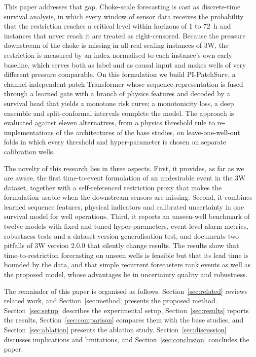 This paper addresses that gap. Choke-scale forecasting is cast as discrete-time survival analysis, in which
every window of sensor data receives the probability that the restriction reaches a critical level within
horizons of 1 to 72~h and instances that never reach it are treated as right-censored. Because the
pressure downstream of the choke is missing in all real scaling instances of 3W, the restriction is measured
by an index normalised to each instance's own early baseline, which serves both as label and as causal input
and makes wells of very different pressure comparable. On this formulation we build PI-PatchSurv, a
channel-independent patch Transformer whose sequence representation is fused through a learned gate with a
branch of physics features and decoded by a survival head that yields a monotone risk curve; a monotonicity
loss, a deep ensemble and split-conformal intervals complete the model. The approach is evaluated against
eleven alternatives, from a physics threshold rule to re-implementations of the architectures of the base
studies, on leave-one-well-out folds in which every threshold and hyper-parameter is chosen on separate
calibration wells.

The novelty of this research lies in three aspects. First, it provides, as far as we are aware, the first
time-to-event formulation of an undesirable event in the 3W dataset, together with a self-referenced
restriction proxy that makes the formulation usable when the downstream sensors are missing. Second, it
combines learned sequence features, physical indicators and calibrated uncertainty in one survival model
for well operations. Third, it reports an unseen-well benchmark of twelve models with fixed and tuned
hyper-parameters, event-level alarm metrics, robustness tests and a dataset-version generalisation test, and
documents two pitfalls of 3W version 2.0.0 that silently change results. The results show that
time-to-restriction forecasting on unseen wells is feasible but that its lead time is bounded by the data,
and that simple recurrent forecasters rank events as well as the proposed model, whose advantages lie in
uncertainty quality and robustness.

The remainder of this paper is organised as follows. Section~\ref{sec:related} reviews related work, and
Section~\ref{sec:method} presents the proposed method. Section~\ref{sec:setup} describes the experimental
setup, Section~\ref{sec:results} reports the results, Section~\ref{sec:comparison} compares them with the
base studies, and Section~\ref{sec:ablation} presents the ablation study. Section~\ref{sec:discussion}
discusses implications and limitations, and Section~\ref{sec:conclusion} concludes the paper.

